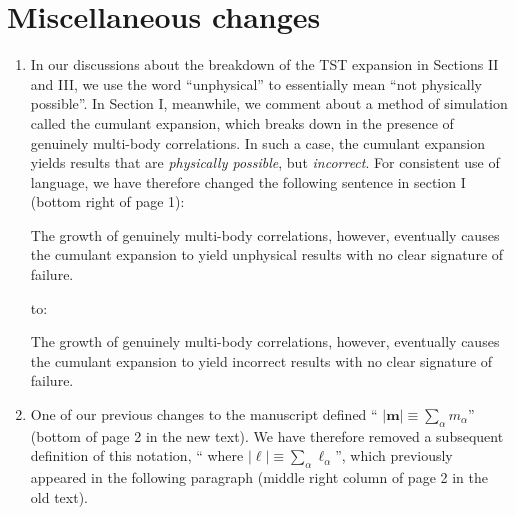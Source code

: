 \documentclass[preprint,superscriptaddress]{revtex4-2}
\renewcommand{\v}{\bm} %
\renewcommand{\abs}[1]{\lvert #1 \rvert}
\newcommand{\1}{\mathds{1}}
\newcommand{\red}[1]{{\color{red} #1}}
\newcommand{\green}[1]{{\color{ForestGreen} #1}}
\begin{document}
\section{Miscellaneous changes}

\begin{enumerate}
\item In our discussions about the breakdown of the TST expansion in
  Sections II and III, we use the word ``unphysical'' to essentially
  mean ``not physically possible''.  In Section I, meanwhile, we
  comment about a method of simulation called the cumulant expansion,
  which breaks down in the presence of genuinely multi-body
  correlations.  In such a case, the cumulant expansion yields results
  that are {\it physically possible}, but {\it incorrect}.  For
  consistent use of language, we have therefore changed the following
  sentence in section I (bottom right of page 1):

  \red{The growth of genuinely multi-body correlations, however,
    eventually causes the cumulant expansion to yield unphysical
    results with no clear signature of failure.}

  to:

  \green{The growth of genuinely multi-body correlations, however,
    eventually causes the cumulant expansion to yield incorrect
    results with no clear signature of failure.}


\item One of our previous changes to the manuscript defined
  ``\green{$\abs{\v m}\equiv\sum_\alpha m_\alpha$}'' (bottom of page 2
  in the new text).  We have therefore removed a subsequent definition
  of this notation, ``\red{where
    $\abs{\v\ell}\equiv\sum_\alpha\ell_\alpha$}'', which previously
  appeared in the following paragraph (middle right column of page 2
  in the old text).

\end{enumerate}
\end{document}
